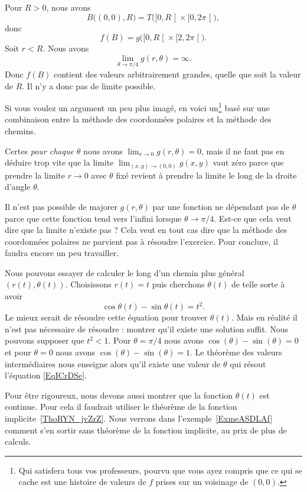 \begin{example}
    Pour \( R>0\), nous avons
    \begin{equation}
        B\big( (0,0),R \big)=T\big( \mathopen[ 0 , R \mathclose[\times \mathopen[ 0 , 2\pi \mathclose[ \big),
    \end{equation}
    donc
    \begin{equation}
        f(B)=g\big( \mathopen[ 0 , R \mathclose[\times \mathopen[ 2 , 2\pi \mathclose[ \big).
    \end{equation}
    Soit \( r<R\). Nous avons
    \begin{equation}
        \lim_{\theta\to \pi/4} g(r,\theta)=\infty.
    \end{equation}
    Donc \( f(B)\) contient des valeurs arbitrairement grandes, quelle que soit la valeur de \( R\). Il n'y a donc pas de limite possible.
    
    Si vous voulez un argument un peu plus imagé, en voici un\footnote{Qui satisfera tous vos professeurs, pourvu que vous ayez compris que ce qui se cache est une histoire de valeurs de \( f\) prises sur un voisinage de \( (0,0)\).} basé sur une combinaison entre la méthode des coordonnées polaires et la méthode des chemins.
    
	Certes \emph{pour chaque $\theta$} nous avons $\lim_{r\to 0} g(r,\theta)=0$, mais il ne faut pas en déduire trop vite que la limite $\lim_{(x,y)\to(0,0)}g(x,y)$ vaut zéro parce que prendre la limite $r\to 0$ avec $\theta$ fixé revient à prendre la limite le long de la droite d'angle $\theta$.

	Il n'est pas possible de majorer $g(r,\theta)$ par une fonction ne dépendant pas de $\theta$ parce que cette fonction tend vers l'infini lorsque $\theta\to\pi/4$. Est-ce que cela veut dire que la limite n'existe pas ? Cela veut en tout cas dire que la méthode des coordonnées polaires ne parvient pas à résoudre l'exercice. Pour conclure, il faudra encore un peu travailler.

    Nous pouvons essayer de calculer le long d'un chemin plus général \( (r(t),\theta(t))\). Choisissons \( r(t)=t\) puis cherchons \( \theta(t)\) de telle sorte à avoir
    \begin{equation}        \label{EqICrDSe}
        \cos\theta(t)-\sin\theta(t)=t^2.
    \end{equation}
    Le mieux serait de résoudre cette équation pour trouver \( \theta(t)\). Mais en réalité il n'est pas nécessaire de résoudre : montrer qu'il existe une solution suffit. Nous pouvons supposer que \( t^2<1\). Pour \( \theta=\pi/4\) nous avons \( \cos(\theta)-\sin(\theta)=0\) et pour \( \theta=0\) nous avons \( \cos(\theta)-\sin(\theta)=1\). Le théorème des valeurs intermédiaires nous enseigne alors qu'il existe une valeur de \( \theta\) qui résout l'équation \eqref{EqICrDSe}.

    Pour être rigoureux, nous devons aussi montrer que la fonction \( \theta(t)\) est continue. Pour cela il faudrait utiliser le théorème de la fonction implicite~\ref{ThoRYN_jvZrZ}.
    Nous verrons dans l'exemple~\ref{ExmeASDLAf} comment s'en sortir sans théorème de la fonction implicite, au prix de plus de calculs.
\end{example}


